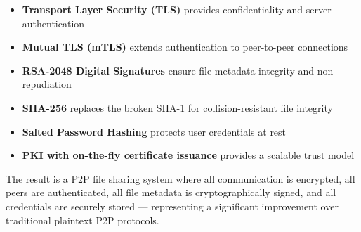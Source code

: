 \documentclass[12pt,a4paper]{article}
\begin{document}
\begin{itemize}
    \item \textbf{Transport Layer Security (TLS)} provides confidentiality and server authentication
    \item \textbf{Mutual TLS (mTLS)} extends authentication to peer-to-peer connections
    \item \textbf{RSA-2048 Digital Signatures} ensure file metadata integrity and non-repudiation
    \item \textbf{SHA-256} replaces the broken SHA-1 for collision-resistant file integrity
    \item \textbf{Salted Password Hashing} protects user credentials at rest
    \item \textbf{PKI with on-the-fly certificate issuance} provides a scalable trust model
\end{itemize}

The result is a P2P file sharing system where all communication is encrypted, all peers are authenticated, all file metadata is cryptographically signed, and all credentials are securely stored --- representing a significant improvement over traditional plaintext P2P protocols.
\end{document}
